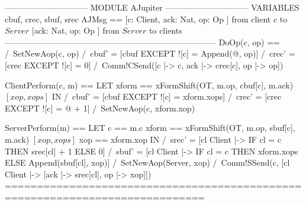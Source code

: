\documentclass{article}
\begin{document}
\begin{tla}
------------------------------ MODULE AJupiter ------------------------------
VARIABLES cbuf, crec, sbuf, srec
AJMsg == [c: Client, ack: Nat, op: Op ] \cup \* from client $c$ to $Server$ 
         [ack: Nat, op: Op ] \* from $Server$ to clients
-----------------------------------------------------------------------------
DoOp(c, op) == 
    /\ SetNewAop(c, op)
    /\ cbuf' = [cbuf EXCEPT ![c] = Append(@, op)]
    /\ crec' = [crec EXCEPT ![c] = 0]
    /\ Comm!CSend([c |-> c, ack |-> crec[c], op |-> op])

ClientPerform(c, m) == 
    LET xform == xFormShift(OT, m.op, cbuf[c], m.ack) \* $[xop, xops]$
    IN  /\ cbuf' = [cbuf EXCEPT ![c] = xform.xops]
        /\ crec' = [crec EXCEPT ![c] = @ + 1]
        /\ SetNewAop(c, xform.xop)

ServerPerform(m) == 
    LET     c == m.c             
        xform == xFormShift(OT, m.op, sbuf[c], m.ack) \* $[xop, xops]$
          xop == xform.xop
    IN  /\ srec' = [cl \in Client |-> IF cl = c THEN srec[cl] + 1 ELSE 0] 
        /\ sbuf' = [cl \in Client |-> IF cl = c THEN xform.xops 
                                                ELSE Append(sbuf[cl], xop)] 
        /\ SetNewAop(Server, xop)
        /\ Comm!SSend(c, [cl \in Client |-> [ack |-> srec[cl], op |-> xop]])
=============================================================================
\end{tla}
\end{document}
